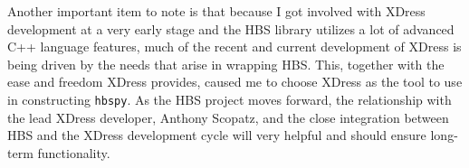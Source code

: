     Another important item to note is that because I got involved with XDress development at a very early stage and the HBS library utilizes a lot of advanced C++ language features, much of the recent and current development of XDress is being driven by the needs that arise in wrapping HBS. This, together with the ease and freedom XDress provides, caused me to choose XDress as the tool to use in constructing \texttt{hbspy}. As the HBS project moves forward, the relationship with the lead XDress developer, Anthony Scopatz, and the close integration between HBS and the XDress development cycle will very helpful and should ensure long-term functionality.

